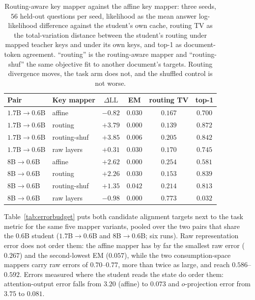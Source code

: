 \documentclass[11pt]{article}
\newcommand{\dll}{\Delta\text{LL}}
\begin{document}
\begin{table}[t]
\centering
\small
\caption{Routing-aware key mapper against the affine key mapper: three seeds, $56$
held-out questions per seed, likelihood as the mean answer log-likelihood
difference against the student's own cache, routing TV as the total-variation
distance between the student's routing under mapped teacher keys and under its own
keys, and top-1 as document-token agreement. ``routing'' is the routing-aware
mapper and ``routing-shuf'' the same objective fit to another document's targets.
Routing divergence moves, the task arm does not, and the shuffled control is not
worse.}
\label{tab:routingkey}
\begin{tabular}{llcccc}
\toprule
Pair & Key mapper & $\dll$ & EM & routing TV & top-1 \\
\midrule
$1.7$B$\to0.6$B & affine        & $-0.82$ & $0.030$ & $0.167$ & $0.700$ \\
$1.7$B$\to0.6$B & routing       & $+3.79$ & $0.000$ & $0.139$ & $0.872$ \\
$1.7$B$\to0.6$B & routing-shuf  & $+3.85$ & $0.006$ & $0.205$ & $0.842$ \\
$1.7$B$\to0.6$B & raw layers    & $+0.31$ & $0.030$ & $0.170$ & $0.745$ \\
\midrule
$8$B$\to0.6$B & affine          & $+2.62$ & $0.000$ & $0.254$ & $0.581$ \\
$8$B$\to0.6$B & routing         & $+2.26$ & $0.030$ & $0.153$ & $0.839$ \\
$8$B$\to0.6$B & routing-shuf    & $+1.35$ & $0.042$ & $0.214$ & $0.813$ \\
$8$B$\to0.6$B & raw layers      & $-0.98$ & $0.000$ & $0.773$ & $0.032$ \\
\bottomrule
\end{tabular}
\end{table}

Table~\ref{tab:errorbudget} puts both candidate alignment targets next to the
task metric for the same five mapper variants, pooled over the two pairs that
share the $0.6$B student ($1.7$B$\to0.6$B and $8$B$\to0.6$B; six runs). Raw
representation error does not order them: the affine mapper has by far the
smallest raw error ($0.267$) and the second-lowest EM ($0.057$), while the two
consumption-space mappers carry raw errors of $0.70$--$0.77$, more than twice as
large, and reach $0.586$--$0.592$. Errors measured where the student reads the
state do order them: attention-output error falls from $3.20$ (affine) to $0.073$
and $o$-projection error from $3.75$ to $0.081$.
\end{document}
